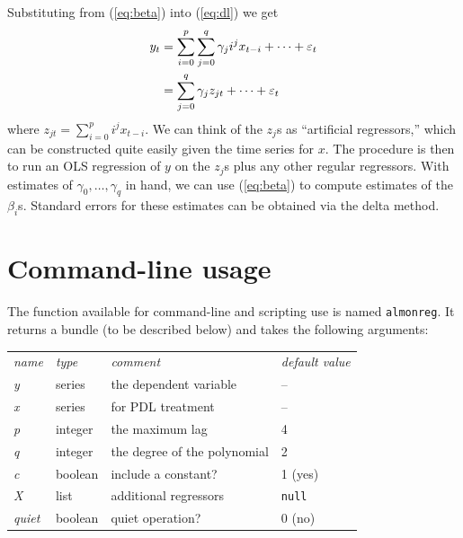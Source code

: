 \documentclass{article}
\begin{document}
Substituting from (\ref{eq:beta}) into (\ref{eq:dl}) we get
%
\begin{align}
y_t &= \sum_{i=0}^p \sum_{j=0}^q \gamma_j i^j x_{t-i} + \cdots +
\varepsilon_t \notag \\
 &= \sum_{j=0}^q \gamma_j z_{jt} + \cdots + \varepsilon_t
\end{align}
%
where $z_{jt} = \sum_{i=0}^p i^j x_{t-i}$. We can think of the $z_j$s
as ``artificial regressors,'' which can be constructed quite easily
given the time series for $x$. The procedure is then to run an OLS
regression of $y$ on the $z_j$s plus any other regular regressors.
With estimates of $\gamma_0,\dots,\gamma_q$ in hand, we can use
(\ref{eq:beta}) to compute estimates of the $\beta_i$s. Standard
errors for these estimates can be obtained via the delta method.

\section{Command-line usage}

The function available for command-line and scripting use is
named \texttt{almonreg}. It returns a bundle (to be described below)
and takes the following arguments:

\begin{center}
\begin{tabular}{llll}
  \textit{name} & \textit{type} & \textit{comment} & \textit{default value} \\[4pt]
  \textsl{y} & series & the dependent variable & --  \\
  \textsl{x} & series & for PDL treatment &  -- \\
  \textsl{p} & integer & the maximum lag & 4\\
  \textsl{q} & integer & the degree of the polynomial & 2\\
  \textsl{c} & boolean & include a constant? & 1 (yes)\\
  \textsl{X} & list & additional regressors & \texttt{null} \\
  \textsl{quiet} & boolean & quiet operation? & 0 (no)
\end{tabular}
\end{center}
\end{document}
